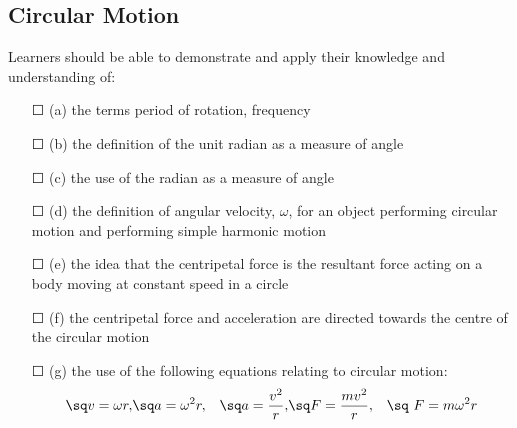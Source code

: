 \subsection{Circular Motion}
Learners should be able to demonstrate and apply their knowledge and
understanding of:
\begin{itemize}
	\item[\Large{$\Square$}](a) the terms \sq period of rotation, \sq frequency
	\item[\Large{$\Square$}](b) the definition of the unit radian as a measure of angle
	\item[\Large{$\Square$}](c) the use of the radian as a measure of angle
	\item[\Large{$\Square$}](d) the definition of angular velocity, $\omega$, for an object performing \sq circular motion and performing \sq simple harmonic motion
	\item[\Large{$\Square$}](e) the idea that the centripetal force is the resultant force acting on a body moving at constant speed in a circle
	\item[\Large{$\Square$}](f) the centripetal force and acceleration are directed towards the centre of the circular motion
	\item[\Large{$\Square$}](g) the use of the following equations relating to circular motion:
	\[\begin{aligned}
	\text{\sq} v=\omega r, &\text{\sq} a=\omega^{2} r, & \text{\sq} a=\frac{v^{2}}{r},& \text{\sq} F=\frac{mv^{2}}{r},&\text{\sq } F=m\omega^{2}r
	\end{aligned}
	\]
	
	
\end{itemize}
